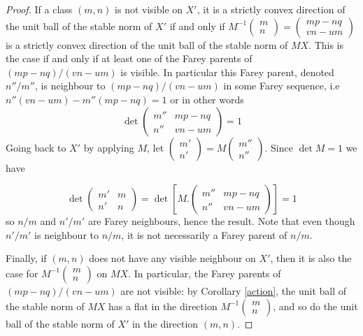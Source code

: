 \documentclass{article}
\theoremstyle{definition}
\begin{document}
\begin{proof}
If a class $(m,n)$ is not visible on $X'$, it is a strictly convex direction of the unit ball of the stable norm of $X'$ if and only if $M^{-1} \begin{pmatrix} m \\ n \end{pmatrix}= \begin{pmatrix}
    mp-nq \\ vn-um
\end{pmatrix}$ is a strictly convex direction of the unit ball of the stable norm of $MX$.
This is the case if and only if at least one of the Farey parents of $(mp-nq)/(vn-um)$ is visible. In particular this Farey parent, denoted $n''/m''$, is neighbour to $(mp-nq)/(vn-um)$ in some Farey sequence, i.e $n''(vn-um) - m''(mp-nq)=1$ or in other words
$$\det \begin{pmatrix}
    m'' & mp-nq \\ n'' & vn-um
\end{pmatrix} = 1$$
Going back to $X'$ by applying $M$, let $\begin{pmatrix}
    m' \\ n'
\end{pmatrix} = M\begin{pmatrix}
    m'' \\ n''
\end{pmatrix}$. Since $\det M =1$ we have

$$\det \begin{pmatrix} m' & m \\ n' & n \end{pmatrix} = \det \left [ M. \begin{pmatrix}
    m'' & mp-nq \\ n'' & vn-um
\end{pmatrix} \right ] = 1$$
so $n/m$ and $n'/m'$ are Farey neighbours, hence the result. Note that even though $n'/m'$ is neighbour to $n/m$, it is not necessarily a Farey parent of $n/m$. \newline 

Finally, if $(m,n)$ does not have any visible neighbour on $X'$, then it is also the case for $M^{-1} \begin{pmatrix} m \\ n \end{pmatrix}$ on $MX$. In particular, the Farey parents of $(mp-nq)/(vn-um)$ are not visible: by Corollary \ref{action}, the unit ball of the stable norm of $MX$ has a flat in the direction $M^{-1} \begin{pmatrix} m \\ n \end{pmatrix}$, and so do the unit ball of the stable norm of $X'$ in the direction $(m,n)$.






\end{proof}
\end{document}
